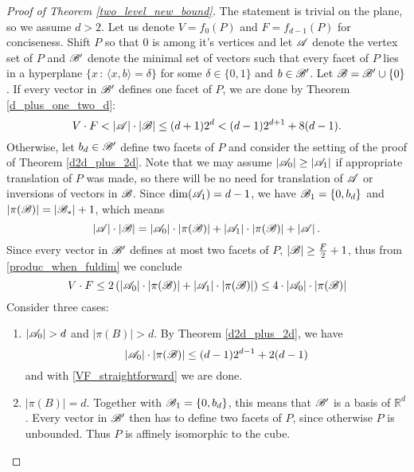 \begin{proof}[Proof of Theorem \ref{two_level_new_bound}]
    The statement is trivial on the plane, so we assume $d > 2$. Let us denote $V=f_0(P)$ and $F=f_{d-1}(P)$ for conciseness. Shift $P$ so that $0$ is among it's vertices and let ${\mathscr{A}}$ denote the vertex set of $P$ and ${\mathscr{B}}'$ denote the minimal set of vectors such that every facet of $P$ lies in a hyperplane $\{x\,:\,\langle x,b \rangle = \delta \}$ for some $\delta\in\{0,1\}$ and $b\in{\mathscr{B}}'$. Let ${\mathscr{B}} = {\mathscr{B}}' \cup \{0\}$.
    If every vector in ${\mathscr{B}}'$ defines one facet of $P$, we are done by Theorem \ref{d_plus_one_two_d}: 
    \[V\cdot F < \left|{\mathscr{A}}\right|\cdot\left|{\mathscr{B}}\right| \leq (d+1)2^d<(d-1)2^{d+1}+8(d-1).\]
    Otherwise, let $b_d\in{\mathscr{B}}'$ define two facets of $P$ and consider the setting of the proof of Theorem \ref{d2d_plus_2d}. Note that we may assume $\left|{\mathscr{A}}_0\right|\geq \left|{\mathscr{A}}_1\right|$ if appropriate translation of $P$ was made, so there will be no need for translation of ${\mathscr{A}}$ or inversions of vectors in ${\mathscr{B}}$. Since $\operatorname{dim}({\mathscr{A}}_1)=d-1$, we have ${\mathscr{B}}_1=\{0,b_d\}$ and $\left|\pi({\mathscr{B}})\right|=\left|{\mathscr{B}}_*\right|+1$, which means 
    \begin{equation}\label{produc_when_fuldim}
        \left|{\mathscr{A}}\right|\cdot\left|{\mathscr{B}}\right|=\left|{\mathscr{A}}_0\right|\cdot\left|\pi({\mathscr{B}})\right|+\left|{\mathscr{A}}_1\right|\cdot\left|\pi({\mathscr{B}})\right|+\left|{\mathscr{A}}\right|.
    \end{equation}
    Since every vector in ${\mathscr{B}}'$ defines at most two facets of $P$, $\left|{\mathscr{B}}\right| \geq \frac{F}{2}+1$, thus from \eqref{produc_when_fuldim} we conclude
    \begin{equation}\label{VF_straightforward}
        V\cdot F \leq 2 \left(\left|{\mathscr{A}}_0\right|\cdot\left|\pi({\mathscr{B}})\right|+\left|{\mathscr{A}}_1\right|\cdot\left|\pi({\mathscr{B}})\right|\right) \leq 4\cdot\left|{\mathscr{A}}_0\right|\cdot\left|\pi({\mathscr{B}})\right|
    \end{equation}
    Consider three cases:
    \begin{enumerate}
        \item $\left|{\mathscr{A}}_0\right| > d$ and $\left|\pi(B)\right| > d$. By Theorem \ref{d2d_plus_2d}, we have
        \[\left|{\mathscr{A}}_0\right|\cdot\left|\pi({\mathscr{B}})\right| \leq (d-1)2^{d-1}+2(d-1)\]
        and with \eqref{VF_straightforward} we are done. 
        \item $\left|\pi(B)\right| = d$. Together with ${\mathscr{B}}_1=\{0,b_d\}$, this means that ${\mathscr{B}}'$ is a basis of $\mathbb{R}^d$. Every vector in ${\mathscr{B}}'$ then has to define two facets of $P$, since otherwise $P$ is unbounded. Thus $P$ is affinely isomorphic to the cube.

\end{enumerate}
\end{proof}
